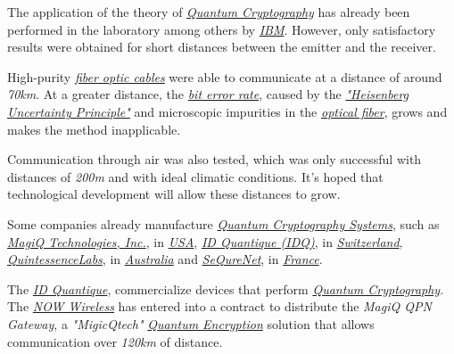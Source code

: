 \documentclass[conference]{IEEEtran}
\begin{document}
The application of the theory of \href{https://en.wikipedia.org/wiki/Quantum_cryptography}{\textit{Quantum Cryptography}} has already been performed in the laboratory among others by \href{https://en.wikipedia.org/wiki/IBM}{\textit{IBM}}. However, only satisfactory results were obtained for short distances between the emitter and the receiver.

\vspace{4pt}

High-purity \href{https://en.wikipedia.org/wiki/Optical_fiber}{\textit{fiber optic cables}} were able to communicate at a distance of around \textit{70km}. At a greater distance, the \href{https://en.wikipedia.org/wiki/Bit_error_rate}{\textit{bit error rate}}, caused by the \href{https://en.wikipedia.org/wiki/Uncertainty_principle}{\textit{"Heisenberg Uncertainty Principle"}} and microscopic impurities in the \href{https://en.wikipedia.org/wiki/Optical_fiber}{\textit{optical fiber}}, grows and makes the method inapplicable.

\vspace{4pt}

Communication through air was also tested, which was only successful with distances of \textit{200m} and with ideal climatic conditions. It's hoped that technological development will allow these distances to grow.

\vspace{4pt}

Some companies already manufacture \href{https://en.wikipedia.org/wiki/Cryptosystem}{\textit{Quantum Cryptography Systems}}, such as \href{https://en.wikipedia.org/wiki/MagiQ_Technologies,_Inc.}{\textit{MagiQ Technologies, Inc.}}, in \href{https://en.wikipedia.org/wiki/United_States}{\textit{USA}}, \href{https://www.idquantique.com/}{\textit{ID Quantique (IDQ)}}, in \href{https://en.wikipedia.org/wiki/Switzerland}{\textit{Switzerland}}, \href{https://en.wikipedia.org/wiki/QuintessenceLabs}{\textit{QuintessenceLabs}}, in \href{https://en.wikipedia.org/wiki/Australia}{\textit{Australia}} and \href{https://www.cbinsights.com/company/sequrenet}{\textit{SeQureNet}}, in \href{https://en.wikipedia.org/wiki/France}{\textit{France}}.

\vspace{4pt}

The \href{https://en.wikipedia.org/wiki/ID_Quantique}{\textit{ID Quantique}}, commercialize devices that perform \href{https://en.wikipedia.org/wiki/Quantum_cryptography}{\textit{Quantum Cryptography}}. The \href{https://nowwireless.com/}{\textit{NOW Wireless}} has entered into a contract to distribute the \textit{MagiQ QPN Gateway}, a \textit{"MigicQtech"} \href{https://en.wikipedia.org/wiki/Quantum_cryptography}{\textit{Quantum Encryption}} solution that allows communication over \textit{120km} of distance.
\end{document}
